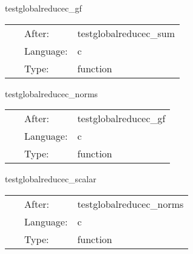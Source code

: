 
\hspace{5mm} testglobalreducec\_gf 

\hspace{5mm}{\it test out gf reduction } 


\hspace{5mm}

 \begin{tabular*}{160mm}{cll} 
~ & After:  & testglobalreducec\_sum \\ 
~ & Language:  & c \\ 
~ & Type:  & function \\ 
\end{tabular*} 


\vspace{5mm}


\hspace{5mm} testglobalreducec\_norms 

\hspace{5mm}{\it test out gf reduction } 


\hspace{5mm}

 \begin{tabular*}{160mm}{cll} 
~ & After:  & testglobalreducec\_gf \\ 
~ & Language:  & c \\ 
~ & Type:  & function \\ 
\end{tabular*} 


\vspace{5mm}


\hspace{5mm} testglobalreducec\_scalar 

\hspace{5mm}{\it test out gf reduction } 


\hspace{5mm}

 \begin{tabular*}{160mm}{cll} 
~ & After:  & testglobalreducec\_norms \\ 
~ & Language:  & c \\ 
~ & Type:  & function \\ 
\end{tabular*} 


\vspace{5mm}

